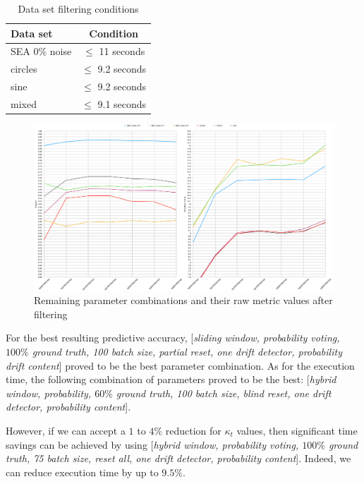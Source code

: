 \begin{table}[]
\centering
\caption{\label{table:rank_both_filter_dataset}Data set filtering conditions}
\begin{tabular}{|l|c|} 
\hline
\textbf{Data set} & \textbf{Condition} \\ \hline \hhline{==}
SEA $0\%$ noise & $\le$ 11 seconds \\ \hline
circles & $\le$ 9.2 seconds \\ \hline
sine & $\le$ 9.2 seconds \\ \hline
mixed & $\le$ 9.1 seconds \\ \hline
\end{tabular}
\end{table}

\begin{figure}
  \includegraphics[width=\linewidth]{./images/chapter5/compare_both_best}
\caption{\label{fig:compare_both_best}Remaining parameter combinations and their raw metric values after filtering}
\end{figure}

For the best resulting predictive accuracy, [\textit{sliding window, probability voting, $100\%$ ground truth, 100 batch size, partial reset, one drift detector, probability drift content}] proved to be the best parameter combination. As for the execution time,  the following combination of parameters proved to be the best: [\textit{hybrid window, probability, $60\%$ ground truth, 100 batch size, blind reset, one drift detector, probability content}]. 

However, if we can accept a $1$ to $4\%$ reduction for $\kappa_t$ values, then significant time savings can be achieved by using [\textit{hybrid window, probability voting, $100\%$ ground truth, 75 batch size, reset all, one drift detector, probability content}]. Indeed, we can reduce execution time by up to $9.5\%$.

